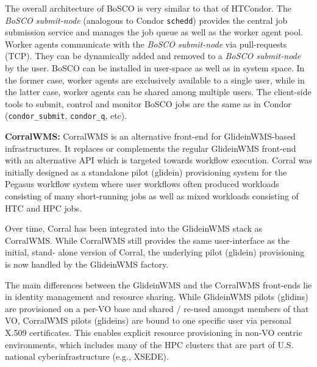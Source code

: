 \documentclass{sig-alternate}
\begin{document}
The overall architecture of BoSCO is very similar to that of HTCondor. The
\textit{BoSCO submit-node} (analogous to Condor \texttt{schedd}) provides the
central job submission service and manages the job queue as well as the worker
agent pool. Worker agents communicate with the \textit{BoSCO submit-node} via
pull-requests (TCP). They can be dynamically added and removed to a
\textit{BoSCO submit-node} by the user. BoSCO can be installed in user-space
as well as in system space. In the former case, worker agents are exclusively
available to a single user, while in the latter case, worker agents can be
shared among multiple users. The client-side tools to submit, control and
monitor BoSCO jobs are the same as in Condor (\texttt{condor\_submit},
\texttt{condor\_q}, etc).


\textbf{CorralWMS:} CorralWMS is an alternative front-end for GlideinWMS-based
infrastructures. It replaces or complements the regular GlideinWMS front-end
with an alternative API which is targeted towards workflow execution. Corral was
initially designed as a standalone pilot (glidein) provisioning system for
the Pegasus workflow system where user  workflows often produced workloads
consisting of many short-running jobs as well as mixed workloads consisting of
HTC and HPC jobs.

Over time, Corral has been integrated into the GlideinWMS stack as CorralWMS.
While CorralWMS still provides the same user-interface as the initial, stand-
alone version of Corral, the underlying pilot (glidein) provisioning is
now handled by the GlideinWMS factory.

The main differences between the GlideinWMS and the CorralWMS front-ends lie in
identity management and resource sharing. While GlideinWMS pilots (glidins) are
provisioned on a per-VO base and shared / re-used amongst members of that VO,
CorralWMS pilots (glideins) are bound to one specific user via personal  X.509
certificates. This enables explicit resource provisioning in non-VO centric
environments, which includes many of the HPC clusters that are part of U.S.
national cyberinfrastructure (e.g., XSEDE).


%
\end{document}
